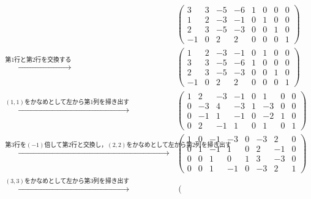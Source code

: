 \documentclass[uplatex,dvipdfmx,a4paper,11pt,fleqn]{jsarticle}
\begin{document}
\begin{leftbar}
        \begin{align*} 
        &
        \left( 
            \begin{array}{cccc|cccc}
            3 & 3 & -5 & -6 & 1 & 0 & 0 & 0\\ 
            1 & 2 & -3 & -1 & 0 & 1 & 0 & 0 \\ 
            2 & 3 & -5 & -3 & 0 & 0 & 1 & 0 \\
            -1 & 0 & 2 & 2 & 0 & 0 & 0 & 1 
            \end{array}
            \right) \\
           \xrightarrow{\text{第$1$行と第$2$行を交換する}} &
            \left( \begin{array}{cccc|cccc}
                1 & 2 & -3 & -1 & 0 & 1 & 0 & 0 \\ 
                3 & 3 & -5 & -6 & 1 & 0 & 0 & 0\\ 
                2 & 3 & -5 & -3 & 0 & 0 & 1 & 0 \\
                -1 & 0 & 2 & 2 & 0 & 0 & 0 & 1 
                \end{array}
                \right)\\
           \xrightarrow{\text{$(1,1)$をかなめとして左から第1列を掃き出す}} &
           \left( \begin{array}{cccc|cccc}
            1 & 2 & -3 & -1 & 0 & 1 & 0 & 0 \\ 
            0 & -3 & 4 & -3 & 1 & -3 & 0 & 0\\ 
            0 & -1 & 1 & -1 & 0 & -2 & 1 & 0 \\
            0 & 2 & -1 & 1 & 0 & 1 & 0 & 1 
            \end{array}
            \right)\\
            \xrightarrow{\text{第$3$行を$(-1)$倍して第2行と交換し，$(2,2)$をかなめとして左から第$2$列を掃き出す}} &
           \left( \begin{array}{cccc|cccc}
            1 & 0 & -1 & -3 & 0 & -3 & 2 & 0 \\ 
            0 & 1 & -1 & 1 & 0 & 2 & -1 & 0 \\
            0 & 0 & 1 & 0 & 1 & 3 & -3 & 0\\ 
            0 & 0 & 1 & -1 & 0 & -3 & 2 & 1 
            \end{array}
            \right)\\
            \xrightarrow{\text{$(3,3)$をかなめとして左から第$3$列を掃き出す}} &
            \left( \begin{array}{cccc|cccc}

\end{array}
\end{align*}
\end{leftbar}
\end{document}
